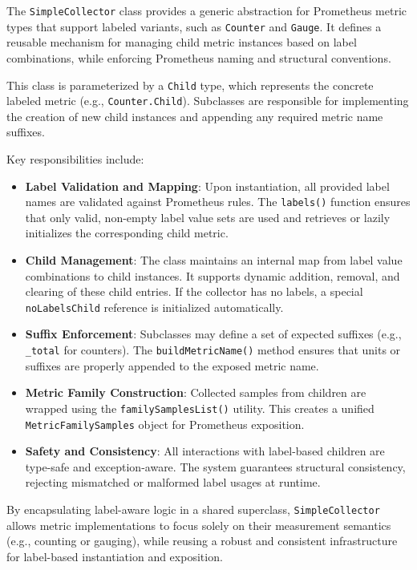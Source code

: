 The \texttt{SimpleCollector} class provides a generic abstraction for Prometheus metric types that support labeled variants, such as \texttt{Counter} and \texttt{Gauge}. It defines a reusable mechanism for managing child metric instances based on label combinations, while enforcing Prometheus naming and structural conventions.

This class is parameterized by a \texttt{Child} type, which represents the concrete labeled metric (e.g., \texttt{Counter.Child}). Subclasses are responsible for implementing the creation of new child instances and appending any required metric name suffixes.

Key responsibilities include:
\begin{itemize}
    \item \textbf{Label Validation and Mapping}: Upon instantiation, all provided label names are validated against Prometheus rules. The \texttt{labels()} function ensures that only valid, non-empty label value sets are used and retrieves or lazily initializes the corresponding child metric.

    \item \textbf{Child Management}: The class maintains an internal map from label value combinations to child instances. It supports dynamic addition, removal, and clearing of these child entries. If the collector has no labels, a special \texttt{noLabelsChild} reference is initialized automatically.

    \item \textbf{Suffix Enforcement}: Subclasses may define a set of expected suffixes (e.g., \texttt{\_total} for counters). The \texttt{buildMetricName()} method ensures that units or suffixes are properly appended to the exposed metric name.

    \item \textbf{Metric Family Construction}: Collected samples from children are wrapped using the \texttt{familySamplesList()} utility. This creates a unified \texttt{MetricFamilySamples} object for Prometheus exposition.

    \item \textbf{Safety and Consistency}: All interactions with label-based children are type-safe and exception-aware. The system guarantees structural consistency, rejecting mismatched or malformed label usages at runtime.
\end{itemize}

By encapsulating label-aware logic in a shared superclass, \texttt{SimpleCollector} allows metric implementations to focus solely on their measurement semantics (e.g., counting or gauging), while reusing a robust and consistent infrastructure for label-based instantiation and exposition.


